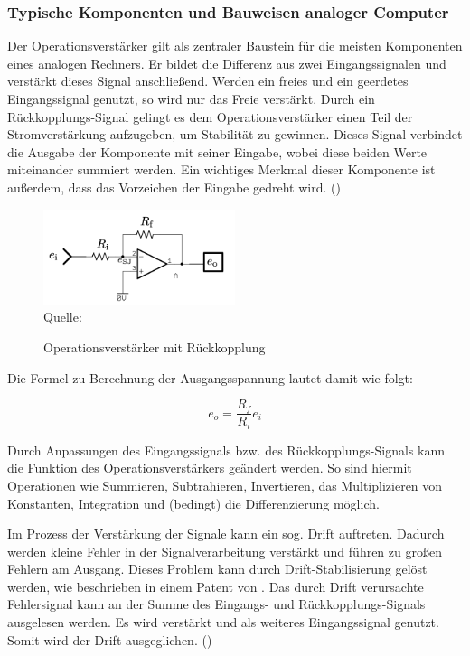 \subsubsection{Typische Komponenten und Bauweisen analoger Computer}
\label{chap:Typische Komponenten und Bauweisen analoger Computer}

Der Operationsverstärker gilt als zentraler Baustein für die meisten Komponenten eines analogen Rechners. Er bildet die Differenz aus zwei Eingangssignalen und verstärkt dieses Signal anschließend. Werden ein freies und ein geerdetes Eingangssignal genutzt, so wird nur das Freie verstärkt. Durch ein Rückkopplungs-Signal gelingt es dem Operationsverstärker einen Teil der Stromverstärkung aufzugeben, um Stabilität zu gewinnen. Dieses Signal verbindet die Ausgabe der Komponente mit seiner Eingabe, wobei diese beiden Werte miteinander summiert werden. Ein wichtiges Merkmal dieser Komponente ist außerdem, dass das Vorzeichen der Eingabe gedreht wird. (\cite[vgl. S. 73 f.]{Ulmann2022})

\begin{figure}[h]
  \label{fig:Operationsverstärker mit Rückkopplung}
  \caption{Operationsverstärker mit Rückkopplung}
  \includegraphics[width=0.5\textwidth]{abbildungen/opamp_mit_rueckkopplung.png}
  \\
  Quelle: \cite[S. 76]{Ulmann2022}
\end{figure}

Die Formel zu Berechnung der Ausgangsspannung lautet damit wie folgt:

\[e_o=\frac{R_f}{R_i}e_i\]

Durch Anpassungen des Eingangssignals bzw. des Rückkopplungs-Signals kann die Funktion des Operationsverstärkers geändert werden. So sind hiermit Operationen wie Summieren, Subtrahieren, Invertieren, das Multiplizieren von Konstanten, Integration und (bedingt) die Differenzierung möglich.

Im Prozess der Verstärkung der Signale kann ein sog. Drift auftreten. Dadurch werden kleine Fehler in der Signalverarbeitung verstärkt und führen zu großen Fehlern am Ausgang. Dieses Problem kann durch Drift-Stabilisierung gelöst werden, wie beschrieben in einem Patent von \cite{Goldberg1954}. Das durch Drift verursachte Fehlersignal kann an der Summe des Eingangs- und Rückkopplungs-Signals ausgelesen werden. Es wird verstärkt und als weiteres Eingangssignal genutzt. Somit wird der Drift ausgeglichen. (\cite[vgl. S. 80]{Ulmann2022})

